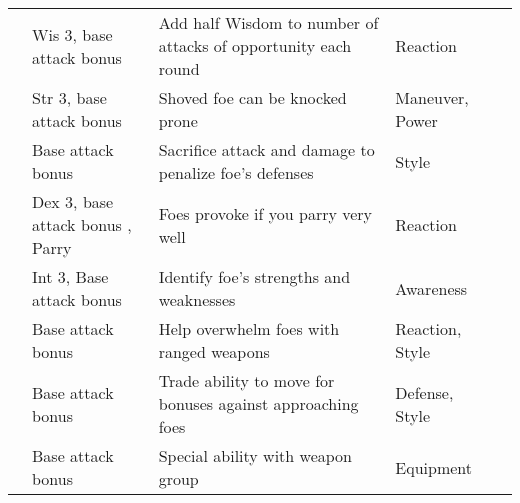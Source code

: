 {\begin{longtabu}{>{\lcol}p{10em} >{\lcol}p{15em} >{\lcol}X >{\lcol}p{6em} >{\lcol}p{3em}}
         & Wis 3, base attack bonus  & Add half Wisdom to number of attacks of opportunity each round & Reaction &  \\
         & Str 3, base attack bonus  & Shoved foe can be knocked prone & Maneuver, Power &  \\
         & Base attack bonus  & Sacrifice attack and damage to penalize foe's defenses & Style &  \\
         & Dex 3, base attack bonus , Parry & Foes provoke if you parry very well & Reaction &  \\
         & Int 3, Base attack bonus  & Identify foe's strengths and weaknesses & Awareness &  \\
         & Base attack bonus  & Help overwhelm foes with ranged weapons & Reaction, Style &  \\
         & Base attack bonus  & Trade ability to move for bonuses against approaching foes & Defense, Style &  \\
         & Base attack bonus  & Special ability with weapon group & Equipment &  \\


\end{longtabu}}
